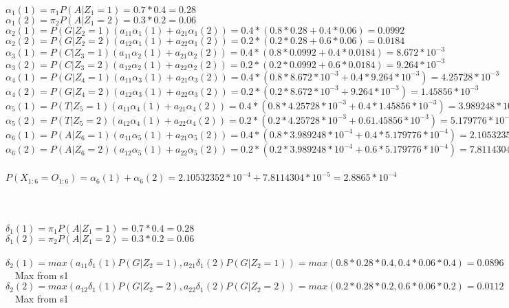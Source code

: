 \documentclass[11pt]{article}
\begin{document}
\\

$\alpha_1(1)=\pi_1P(A|Z_1=1)=0.7*0.4=0.28$\\
$\alpha_1(2)=\pi_2P(A|Z_1=2)=0.3*0.2=0.06$\\
$\alpha_2(1)=P(G|Z_2=1)(a_{11}\alpha_1(1)+a_{21}\alpha_1(2))=0.4*(0.8*0.28+0.4*0.06)=0.0992$\\
$\alpha_2(2)=P(G|Z_2=2)(a_{12}\alpha_1(1)+a_{22}\alpha_1(2))=0.2*(0.2*0.28+0.6*0.06)=0.0184$\\
$\alpha_3(1)=P(C|Z_3=1)(a_{11}\alpha_2(1)+a_{21}\alpha_2(2))=0.4*(0.8*0.0992+0.4*0.0184)=8.672*10^{-3}$\\
$\alpha_3(2)=P(C|Z_3=2)(a_{12}\alpha_2(1)+a_{22}\alpha_2(2))=0.2*(0.2*0.0992+0.6*0.0184)=9.264*10^{-3}$\\
$\alpha_4(1)=P(G|Z_4=1)(a_{11}\alpha_3(1)+a_{21}\alpha_3(2))=0.4*(0.8*8.672*10^{-3}+0.4*9.264*10^{-3})=4.25728*10^{-3}$\\
$\alpha_4(2)=P(G|Z_4=2)(a_{12}\alpha_3(1)+a_{22}\alpha_3(2))=0.2*(0.2*8.672*10^{-3}+9.264*10^{-3})=1.45856*10^{-3}$\\
$\alpha_5(1)=P(T|Z_5=1)(a_{11}\alpha_4(1)+a_{21}\alpha_4(2))=0.4*(0.8*4.25728*10^{-3}+0.4*1.45856*10^{-3})=3.989248*10^{-4}$\\
$\alpha_5(2)=P(T|Z_5=2)(a_{12}\alpha_4(1)+a_{22}\alpha_4(2))=0.2*(0.2*4.25728*10^{-3}+0.61.45856*10^{-3})=5.179776*10^{-4}$\\	
$\alpha_6(1)=P(A|Z_6=1)(a_{11}\alpha_5(1)+a_{21}\alpha_5(2))=0.4*(0.8*3.989248*10^{-4}+0.4*5.179776*10^{-4})=2.10532352*10^{-4}$\\
$\alpha_6(2)=P(A|Z_6=2)(a_{12}\alpha_5(1)+a_{22}\alpha_5(2))=0.2*(0.2*3.989248*10^{-4}+0.6*5.179776*10^{-4})=7.8114304*10^{-5}$\\\\
$P(X_{1:6}=O_{1:6})=\alpha_6(1)+\alpha_6(2)=2.10532352*10^{-4}+7.8114304*10^{-5}=2.8865*10^{-4}$\\\\\\
\\
$\delta_1(1)=\pi_1P(A|Z_1=1)=0.7*0.4=0.28$\\
$\delta_1(2)=\pi_2P(A|Z_1=2)=0.3*0.2=0.06$\\\\
$\delta_2(1)=max(a_{11}\delta_1(1)P(G|Z_2=1),a_{21}\delta_1(2)P(G|Z_2=1))=max(0.8*0.28*0.4,0.4*0.06*0.4)=0.0896$ \ \ Max from s1 \\
$\delta_2(2)=max(a_{12}\delta_1(1)P(G|Z_2=2),a_{22}\delta_1(2)P(G|Z_2=2))=max(0.2*0.28*0.2,0.6*0.06*0.2)=0.0112$\ \ Max from s1\\\\
\end{document}
